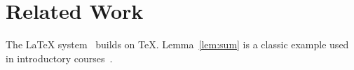 \section{Related Work}
The \LaTeX{} system~\cite{lamport1994} builds on \TeX{}. Lemma~\ref{lem:sum} is a classic
example used in introductory courses~\cite{knuth1984}.
